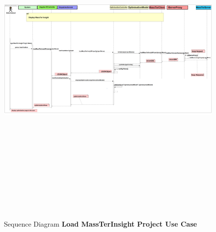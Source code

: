 	\pagebreak
	\clearpage
	\newpage
	\begin{figure}[h]
		\centering
		\includegraphics[width=17.5cm,height=17cm]{SequenceDiagramLoadProject.png}
		\caption{Sequence Diagram \textbf{Load MassTerInsight Project Use Case}}
	\end{figure}
    
    \pagebreak
	\clearpage
	\newpage

